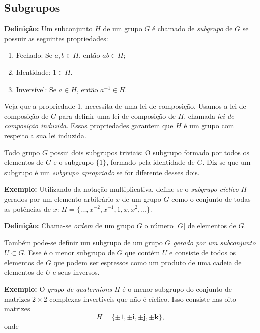 \documentclass[11pt]{article}
\providecommand{\tightlist}{%
      \setlength{\itemsep}{0pt}\setlength{\parskip}{0pt}}
\begin{document}
\hypertarget{subgrupos}{%
\subsection{Subgrupos}\label{subgrupos}}

\textbf{Definição:} Um subconjunto \(H\) de um grupo \(G\) é chamado de
\emph{subgrupo} de \(G\) se possuir as seguintes propriedades:

\begin{enumerate}
\def\labelenumi{\arabic{enumi}.}
\tightlist
\item
  Fechado: Se \(a,b\in H\), então \(ab\in H\);
\item
  Identidade: \(1\in H\).
\item
  Inversível: Se \(a\in H\), então \(a^{-1}\in H\).
\end{enumerate}

Veja que a propriedade 1. necessita de uma lei de composição. Usamos a
lei de composição de \(G\) para definir uma lei de composição de \(H\),
chamada \emph{lei de composição induzida}. Essas propriedades garantem
que \(H\) é um grupo com respeito a sua lei induzida.

Todo grupo \(G\) possui dois subgrupos triviais: O subgrupo formado por
todos os elementos de \(G\) e o subgrupo \(\{1\}\), formado pela
identidade de \(G\). Diz-se que um subgrupo é um \emph{subgrupo
apropriado} se for diferente desses dois.

\textbf{Exemplo:} Utilizando da notação multiplicativa, define-se o
\emph{subgrupo cíclico \(H\)} gerados por um elemento arbitrário \(x\)
de um grupo \(G\) como o conjunto de todas as potências de \(x\):
\(H = \{\dots , x^{-2}, x^{-1},1,x,x^2,\dots\}\).

\textbf{Definição:} Chama-se \emph{ordem} de um grupo \(G\) o número
\(|G|\) de elementos de \(G\).

Também pode-se definir um subgrupo de um grupo \emph{\(G\) gerado por um
subconjunto \(U \subset G\)}. Esse é o menor subgrupo de \(G\) que
contém \(U\) e consiste de todos os elementos de \(G\) que podem ser
espressos como um produto de uma cadeia de elementos de \(U\) e seus
inversos.

\textbf{Exemplo:} O \emph{grupo de quaternions \(H\)} é o menor subgrupo
do conjunto de matrizes \(2\times 2\) complexas invertíveis que não é
cíclico. Isso consiste nas oito matrizes
\[H = \{\pm 1, \pm \mathbf{i}, \pm \mathbf{j}, \pm \mathbf{k}\},\] onde
\end{document}
